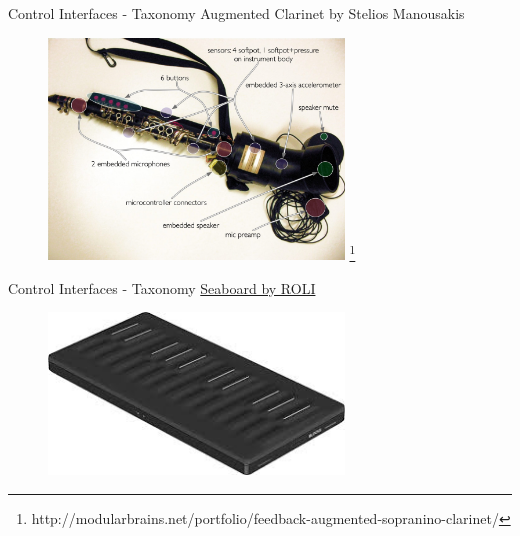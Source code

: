 \documentclass{beamer}
\newcommand\blfootnote[1]{%
  \begingroup
  \renewcommand\thefootnote{}\footnote{#1}%
  \addtocounter{footnote}{-1}%
  \endgroup
}
\begin{document}
\begin{frame}{Control Interfaces - Taxonomy}
    Augmented Clarinet by Stelios Manousakis
    \begin{figure}[h]
        \includegraphics[width=0.7\textwidth]{augmented_clarinet.jpg}\blfootnote{http://modularbrains.net/portfolio/feedback-augmented-sopranino-clarinet/}
    \end{figure}
\end{frame}

\begin{frame}{Control Interfaces - Taxonomy}
    \href{https://www.youtube.com/watch?v=P2syqXx97LE}{Seaboard by ROLI}
    \begin{figure}[h]
        \includegraphics[width=0.7\textwidth]{roli.jpeg}
    \end{figure}
\end{frame}
\end{document}
